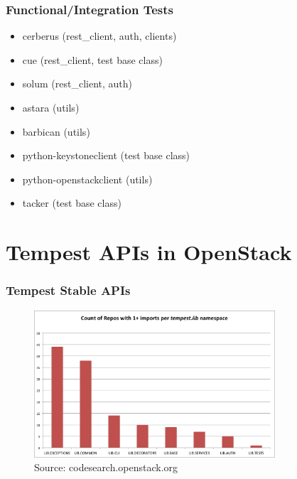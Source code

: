 \documentclass[aspectratio=169,11pt,hyperref={colorlinks=true}]{beamer}
\begin{document}
\begin{frame}
    \frametitle{Functional/Integration Tests}
    \begin{itemize}
        \item{cerberus (rest\_client, auth, clients)}
        \item{cue (rest\_client, test base class)}
        \item{solum (rest\_client, auth)}
    \end{itemize}
    \begin{itemize}
        \item{astara (utils)}
        \item{barbican (utils)}
        \item{python-keystoneclient (test base class)}
        \item{python-openstackclient (utils)}
        \item{tacker (test base class)}
    \end{itemize}
\end{frame}

\section{Tempest APIs in OpenStack}
\begin{frame}
    \frametitle{Tempest Stable APIs}
    \begin{figure}[p]
    	\centering
    	\includegraphics[width=0.8\textwidth]{lib_import_per_namespace.png}
    	\caption{Source: codesearch.openstack.org}
    \end{figure}
\end{frame}
\end{document}
